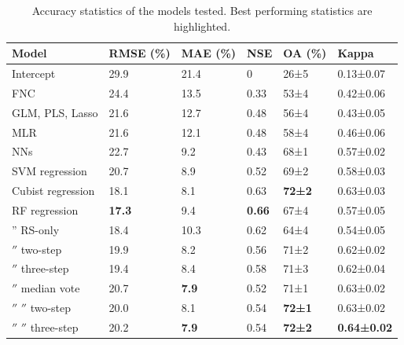 \documentclass[review,authoryear,3p]{elsarticle}
\begin{document}
\begin{table}
\centering
\begin{tabular}{llllll}
\toprule
\textbf{Model} & \textbf{\ac{RMSE} (\%)} & \textbf{\ac{MAE} (\%)} & \textbf{\acrshort{NSE}} & \textbf{\ac{OA} (\%)} & \textbf{Kappa} \\
\midrule
Intercept
& 29.9  & 21.4  & 0     & 26±5  & 0.13±0.07 \\
\Gls{FNC}
& 24.4  & 13.5  & 0.33  & 53±4  & 0.42±0.06 \\
\Gls{GLM}, \Gls{PLS}, Lasso
& 21.6  & 12.7  & 0.48  & 56±4  & 0.43±0.05 \\
\Gls{MLR}
& 21.6  & 12.1  & 0.48  & 58±4  & 0.46±0.06 \\
\Glspl{NN}
& 22.7  & 9.2   & 0.43  & 68±1  & 0.57±0.02 \\
\Gls{SVM} regression
& 20.7  & 8.9   & 0.52  & 69±2  & 0.58±0.03 \\
Cubist regression
& 18.1  & 8.1   & 0.63  & \textbf{72±2}  & 0.63±0.03 \\
\Gls{RF} regression
& \textbf{17.3}  & 9.4   & \textbf{0.66}  & 67±4  & 0.57±0.05 \\
{''} RS-only
& 18.4  & 10.3  & 0.62  & 64±4  & 0.54±0.05 \\
\ensuremath{''} two-step
& 19.9  & 8.2   & 0.56  & 71±2  & 0.62±0.02 \\
\ensuremath{''} three-step
& 19.4  & 8.4   & 0.58  & 71±3  & 0.62±0.04 \\
\ensuremath{''} median vote
& 20.7  & \textbf{7.9}   & 0.52  & 71±1  & 0.63±0.02 \\
\ensuremath{''} \ensuremath{''} two-step
& 20.0  & 8.1   & 0.54  & \textbf{72±1}  & 0.63±0.02 \\
\ensuremath{''} \ensuremath{''} three-step
& 20.2  & \textbf{7.9}   & 0.54  & \textbf{72±2}  & \textbf{0.64±0.02} \\
\bottomrule
\end{tabular}
\caption{Accuracy statistics of the models tested. Best performing statistics are highlighted.}
\label{tab-accuracy}
\end{table}
\end{document}
